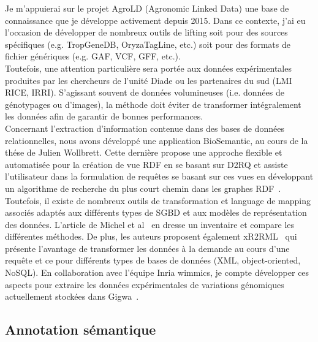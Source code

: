  Je m’appuierai sur le projet AgroLD (Agronomic Linked Data) une base de connaissance que je développe activement depuis 2015. Dans ce contexte, j'ai eu l'occasion de développer de nombreux outils de lifting soit pour des sources spécifiques (e.g.  TropGeneDB, OryzaTagLine, etc.) soit pour des formats de fichier génériques (e.g. GAF, VCF, GFF, etc.). \\

Toutefois, une attention particulière sera portée aux données expérimentales produites par les chercheurs de l’unité Diade ou les partenaires du sud (LMI RICE, IRRI). S’agissant souvent de données volumineuses (i.e. données de génotypages ou d’images), la méthode doit éviter de transformer intégralement les données afin de garantir de bonnes performances.\\

Concernant l'extraction d'information contenue dans des bases de données relationnelles, nous avons développé une application BioSemantic, au cours de la thése de Julien Wollbrett. Cette dernière propose une approche flexible et automatisée pour la création de vue RDF en se basant sur D2RQ  et assiste l'utilisateur dans la formulation de requêtes se basant sur ces vues en développant un algorithme de recherche du plus court chemin dans les graphes RDF~\cite{wollbrett2013clever}. Toutefois, il existe de nombreux outils de transformation et language de mapping associés adaptés aux différents types de SGBD et aux modèles de représentation des données. L'article de Michel et al~\cite{Antipolis2014} en dresse un inventaire et compare les différentes méthodes. De plus, les auteurs proposent également xR2RML~\cite{Michel2015} qui présente l’avantage de transformer les données à la demande au cours d’une requête et ce pour différents types de bases de données (XML, object-oriented, NoSQL). En collaboration avec l’équipe Inria wimmics, je compte développer ces aspects pour extraire les données expérimentales de variations génomiques actuellement stockées dans Gigwa~\cite{Sempere2016}. 

\subsection{Annotation sémantique}

